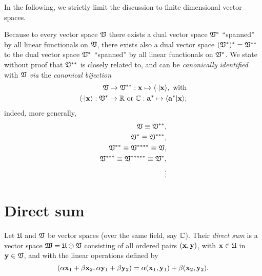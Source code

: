 In the following, we strictly limit the discussion to finite dimensional vector spaces.

Because to every vector  space ${\frak V}$
there exists a dual vector  space ${\frak V}^\ast$ ``spanned'' by all linear functionals on ${\frak V}$,
there exists also a dual vector space $({\frak V}^{\ast})^{\ast}={\frak V}^{\ast \ast}$ to the dual  vector  space ${\frak V}^\ast$
 ``spanned'' by all linear functionals on ${\frak V}^\ast$.
We state without proof
that ${\frak V}^{\ast \ast}$ is closely related to, and can be {\em canonically identified} with ${\frak V}$
{\em via} the {\em canonical bijection}
\begin{equation}
\begin{split}
{\frak V}  \rightarrow {\frak V}^{\ast \ast }: {\bf x}  \mapsto \langle \cdot  \vert {\bf x}\rangle ,
\textrm{ with} \\
\langle \cdot  \vert {\bf x}\rangle : {\frak V}^\ast \rightarrow {\Bbb R}
\textrm{ or }
{\Bbb C} : {\bf a}^\ast  \mapsto \langle {\bf a}^\ast   \vert {\bf x}\rangle
;
\end{split}
\end{equation}
indeed, more generally,
\begin{equation}
\begin{split}
{\frak V}\equiv {\frak V}^{\ast \ast},\\
{\frak V}^\ast \equiv {\frak V}^{\ast \ast \ast},\\
{\frak V}^{\ast \ast} \equiv {\frak V}^{\ast \ast \ast \ast}\equiv {\frak V},\\
{\frak V}^{\ast  \ast \ast} \equiv {\frak V}^{\ast \ast \ast  \ast \ast}\equiv {\frak V}^\ast ,\\
\qquad \vdots
\end{split}
\end{equation}



\section{Direct sum}

Let
${\frak U}$
and
${\frak V}$
be vector spaces (over the same field, say ${\Bbb C}$).
Their {\em direct sum} is a vector space
${\frak W}={\frak U}\oplus{\frak V}$
consisting of all ordered pairs
$({\bf x},{\bf y})$, with
${\bf x}\in {\frak U}$ in
${\bf y}\in {\frak V}$,
and with the linear operations defined by
\begin{equation}
(
\alpha {\bf x}_1 +\beta {\bf x}_2
,
\alpha {\bf y}_1 +\beta {\bf y}_2
)
=
\alpha  ({\bf x}_1,{\bf y}_1)
+
\beta   ({\bf x}_2,{\bf y}_2).
\end{equation}

